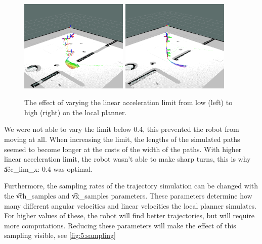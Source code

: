 \begin{figure}
	\centering
	\includegraphics[width=0.46\textwidth]{./img/lowlinearA}
	\includegraphics[width=0.46\textwidth]{./img/highlinearA}
	\caption{The effect of varying the linear acceleration limit from low (left) to high (right) on the local planner.}
	\label{fig:5:acc_lim_x}
\end{figure}

We were not able to vary the limit below 0.4, this prevented the robot from moving at all. When increasing the limit, the lengths of the simulated paths seemed to become longer at the costs of the width of the paths. With higher linear acceleration limit, the robot wasn't able to make sharp turns, this is why \t{acc_lim_x: 0.4} was optimal.

Furthermore, the sampling rates of the trajectory simulation can be changed with the \t{vth_samples} and \t{vx_samples} parameters. These parameters determine how many different angular velocities and linear velocities the local planner simulates. For higher values of these, the robot will find better trajectories, but will require more computations. Reducing these parameters will make the effect of this sampling visible, see \cref{fig:5:sampling}

